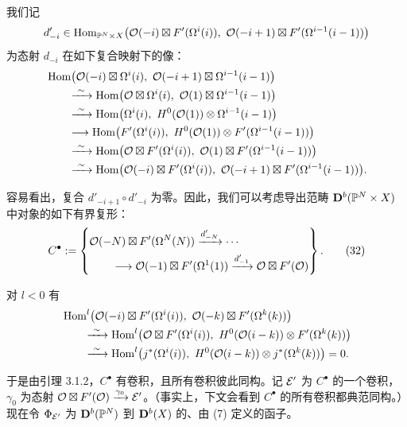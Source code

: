 我们记
\begin{equation*}
d'_{-i}\in\operatorname{Hom}_{\mathbb{P}^{N}\times X}\bigl(\mathcal{O}(-i)\boxtimes F'(\Omega^{i}(i)),\ \mathcal{O}(-i+1)\boxtimes F'(\Omega^{i-1}(i-1))\bigr)
\end{equation*}
为态射 $d_{-i}$ 在如下复合映射下的像：
\begin{align*}
&\Hom\bigl(\cO(-i)\boxtimes\Omega^{i}(i),\ \cO(-i+1)\boxtimes\Omega^{i-1}(i-1)\bigr)\\
&\qquad\iso\Hom\bigl(\cO\boxtimes\Omega^{i}(i),\ \cO(1)\boxtimes\Omega^{i-1}(i-1)\bigr)\\
&\qquad\iso\Hom\bigl(\Omega^{i}(i),\ H^{0}(\cO(1))\otimes\Omega^{i-1}(i-1)\bigr)\\
&\qquad\longrightarrow\Hom\bigl(F'(\Omega^{i}(i)),\ H^{0}(\cO(1))\otimes F'(\Omega^{i-1}(i-1))\bigr)\\
&\qquad\iso\Hom\bigl(\cO\boxtimes F'(\Omega^{i}(i)),\ \cO(1)\boxtimes F'(\Omega^{i-1}(i-1))\bigr)\\
&\qquad\iso\Hom\bigl(\cO(-i)\boxtimes F'(\Omega^{i}(i)),\ \cO(-i+1)\boxtimes F'(\Omega^{i-1}(i-1))\bigr).
\end{align*}

容易看出，复合 $d'_{-i+1}\circ d'_{-i}$ 为零。因此，我们可以考虑导出范畴 $\mathbf{D}^{b}(\mathbb{P}^{N}\times X)$ 中对象的如下有界复形：
\begin{equation}
C^{\bullet}:=\left\{\begin{aligned}
&\mathcal{O}(-N)\boxtimes F'(\Omega^{N}(N))\xrightarrow{d'_{-N}}\cdots\\
&\qquad\longrightarrow\mathcal{O}(-1)\boxtimes F'(\Omega^{1}(1))\xrightarrow{d'_{-1}}\mathcal{O}\boxtimes F'(\mathcal{O})
\end{aligned}\right\}.
\tag{32}
\end{equation}

对 $l<0$ 有
\begin{align*}
&\Hom^{l}\bigl(\cO(-i)\boxtimes F'(\Omega^{i}(i)),\ \cO(-k)\boxtimes F'(\Omega^{k}(k))\bigr)\\
&\qquad\iso\Hom^{l}\bigl(\cO\boxtimes F'(\Omega^{i}(i)),\ H^{0}(\cO(i-k))\otimes F'(\Omega^{k}(k))\bigr)\\
&\qquad\iso\Hom^{l}\bigl(j^{*}(\Omega^{i}(i)),\ H^{0}(\cO(i-k))\otimes j^{*}(\Omega^{k}(k))\bigr)=0.
\end{align*}

于是由引理 3.1.2，$C^{\bullet}$ 有卷积，且所有卷积彼此同构。记 $\mathcal{E}'$ 为 $C^{\bullet}$ 的一个卷积，$\gamma_{0}$ 为态射 $\mathcal{O}\boxtimes F'(\mathcal{O})\xrightarrow{\gamma_{0}}\mathcal{E}'$。（事实上，下文会看到 $C^{\bullet}$ 的所有卷积都典范同构。）现在令 $\Phi_{\mathcal{E}'}$ 为 $\mathbf{D}^{b}(\mathbb{P}^{N})$ 到 $\mathbf{D}^{b}(X)$ 的、由 (7) 定义的函子。

